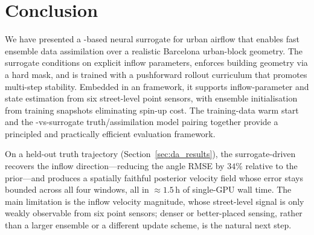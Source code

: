 \section{Conclusion}
\label{sec:conclusion}

We have presented a \pthreed{}-based neural surrogate for urban airflow that enables
fast ensemble data assimilation over a realistic Barcelona urban-block geometry.
The surrogate conditions on explicit inflow parameters, enforces building geometry
via a hard mask, and is trained with a pushforward rollout curriculum that
promotes multi-step stability. Embedded in an \esmda{} framework, it supports
inflow-parameter and state estimation from six street-level point sensors, with
ensemble initialisation from \palm{} training snapshots eliminating spin-up cost. The
training-data warm start and the \palm{}-vs-surrogate truth/assimilation model
pairing together provide a principled and practically efficient evaluation
framework.

On a held-out \palm{} truth trajectory (Section~\ref{sec:da_results}), the
surrogate-driven \esmda{} recovers the inflow direction---reducing the angle RMSE
by $34\%$ relative to the prior---and produces a spatially faithful posterior
velocity field whose error stays bounded across all four windows, all in
$\approx 1.5\,\mathrm{h}$ of single-GPU wall time. The main limitation is the
inflow velocity magnitude, whose street-level signal is only weakly observable
from six point sensors; denser or better-placed sensing, rather than a larger
ensemble or a different update scheme, is the natural next step.

